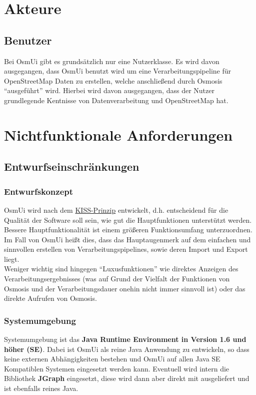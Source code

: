\documentclass[a4paper,10pt]{scrartcl}
\begin{document}
\section{Akteure}
\subsection{Benutzer}
Bei OsmUi gibt es grundsätzlich nur eine Nutzerklasse. Es wird davon ausgegangen, dass OsmUi benutzt wird um eine Verarbeitungspipeline für OpenStreetMap Daten
zu erstellen, welche anschließend durch Osmosis ``ausgeführt'' wird. Hierbei wird davon ausgegangen, dass der Nutzer grundlegende Kentnisse 
von Datenverarbeitung und OpenStreetMap hat.

\section{Nichtfunktionale Anforderungen}
\subsection{Entwurfseinschränkungen}
\subsubsection{Entwurfskonzept}
OsmUi wird nach dem \href{http://de.wikipedia.org/wiki/KISS-Prinzip}{KISS-Prinzip} entwickelt, d.h. entscheidend für die Qualität der Software soll
sein, wie gut die Hauptfunktionen unterstützt werden. Bessere Hauptfunktionalität ist einem größeren Funktionsumfang unterzuordnen.\\
Im Fall von OsmUi heißt dies, dass das Hauptaugenmerk auf dem einfachen und sinnvollen erstellen von Verarbeitungspipelines, sowie deren Import und Export liegt.\\
Weniger wichtig sind hingegen ``Luxusfunktionen'' wie direktes Anzeigen des Verarbeitungsergebnisses (was auf Grund der Vielfalt der Funktionen von Osmosis
und der Verarbeitungsdauer onehin nicht immer sinnvoll ist) oder das direkte Aufrufen von Osmosis.
\subsubsection{Systemumgebung}
Systemumgebung ist das \textbf{Java Runtime Environment in Version 1.6 und höher (SE)}. Dabei ist OsmUi als reine Java Anwendung zu entwickeln, so dass
keine externen Abhängigkeiten bestehen und OsmUi auf allen Java SE Kompatiblen Systemen eingesetzt werden kann.
Eventuell wird intern die Bibliothek \textbf{JGraph} eingesetzt, diese wird dann aber direkt mit ausgeliefert
und ist ebenfalls reines Java. 
\end{document}
